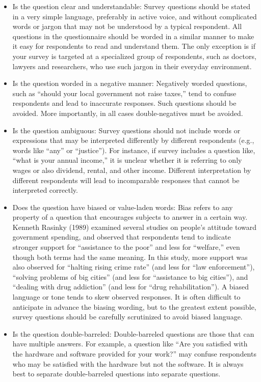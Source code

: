 \begin{itemize}
	\item Is the question clear and understandable: Survey questions should be stated in a very simple language, preferably in active voice, and without complicated words or jargon that may not be understood by a typical respondent. All questions in the questionnaire 	should be worded in a similar manner to make it easy for respondents to read and 	understand them. The only exception is if your survey is targeted at a specialized group of respondents, such as doctors, lawyers and researchers, who use such jargon in their everyday environment.
	\item Is the question worded in a negative manner: Negatively worded questions, such as ``should your local government not raise taxes,'' tend to confuse respondents and lead to inaccurate responses. Such questions should be avoided. More importantly, in all cases double-negatives must be avoided.
	\item Is the question ambiguous: Survey questions should not include words or expressions that may be interpreted differently by different respondents (e.g., words like ``any'' or ``justice''). For instance, if survey includes a question like, ``what is your annual income,'' it is unclear whether it is referring to only wages or also dividend, rental, and other income. Different interpretation by different respondents will lead to incomparable responses that cannot be interpreted correctly.
	\item Does the question have biased or value-laden words: Bias refers to any property of a question that encourages subjects to answer in a certain way. Kenneth Rasinky (1989) examined several studies on people's attitude toward government spending, and observed that respondents tend to indicate stronger support for ``assistance to the poor'' and less for ``welfare,'' even though both terms had the same meaning. In this study, 	more support was also observed for ``halting rising crime rate'' (and less for ``law enforcement''), ``solving problems of big cities'' (and less for ``assistance to big cities''), 	and ``dealing with drug addiction'' (and less for ``drug rehabilitation''). A biased language or tone tends to skew observed responses. It is often difficult to anticipate in advance the biasing wording, but to the greatest extent possible, survey questions should be carefully scrutinized to avoid biased language.
	\item Is the question double-barreled: Double-barreled questions are those that can have multiple answers. For example, a question like ``Are you satisfied with the hardware and software provided for your work?'' may confuse respondents who may be satisfied with the hardware but not the software. It is always best to separate double-barreled questions into separate questions.

\end{itemize}
